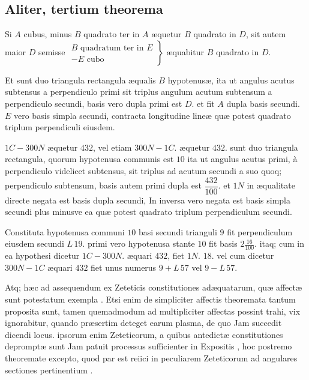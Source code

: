 \documentclass[11pt,a4paper]{article}
\begin{document}
\subsection*{Aliter, tertium theorema}

Si $A$ cubus, minus $B$ quadrato ter in $A$ æquetur $B$ quadrato in $D$, sit autem  maior $D$ semisse $\left.\begin{array}{l} B \text{ quadratum ter in } E \\ - E \text{ cubo} \end{array}\right\}$ æquabitur $B$ quadrato in $D$.

Et sunt duo triangula rectangula æqualis $B$ hypotenusæ, ita ut angulus acutus subtensus a perpendiculo primi sit triplus  angulum acutum subtensum a perpendiculo secundi, basis vero dupla primi est $D$. et fit $A$ dupla basis secundi. $E$ vero basis simpla secundi, contracta \ill{} longitudine lineæ quæ potest quadrato triplum perpendiculi eiusdem.

$1C - 300N$ æquetur $432$, vel etiam $300N - 1C.$ æquetur $432$. sunt duo triangula rectangula, quorum hypotenusa communis est \struck{\ill{}} $10$ ita ut angulus acutus primi, à perpendiculo videlicet subtensus, sit triplus ad acutum secundi a suo quoq; perpendiculo subtensum, basis autem primi dupla est $\dfrac{432}{100}$. et $1N$ in æqualitate directe negata est basis dupla secundi, In inversa vero negata est basis simpla secundi plus minusve ea quæ potest quadrato triplum perpendiculum secundi.

Constituta hypotenusa  communi $10$ basi secundi trianguli $9$ fit perpendiculum eiusdem secundi $L\,19$. primi vero hypotenusa stante $10$ fit basis $2\tfrac{16}{100}$. itaq; cum in ea hypothesi dicetur $1C - 300N.$ æquari $432$, fiet $1N.$ $18$. vel cum dicetur $300N - 1C$ æquari $432$ fiet unus numerus $9 + L\,57$ vel $9 - L\,57$.

Atq; hæc ad assequendum ex Zeteticis constitutiones adæquatarum, quæ affectæ sunt potestatum exempla  . Etsi enim de simpliciter affectis theoremata tantum proposita sunt, tamen quemadmodum ad multipliciter affectas possint trahi, vix ignorabitur, quando præsertim deteget earum plasma, de quo Jam succedit dicendi locus. ipsorum enim Zeteticorum, a quibus antedictæ constitutiones depromptæ sunt Jam patuit processus sufficienter in Expositis \ill{}, hoc postremo theoremate excepto, quod par est reiici in peculiarem Zeteticorum ad angulares sectiones pertinentium \ill{}.
\end{document}
